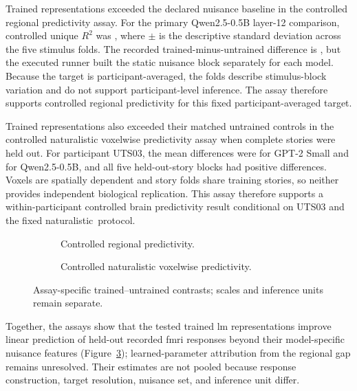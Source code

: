 Trained representations exceeded the declared nuisance baseline in the controlled regional predictivity assay.
For the primary Qwen2.5-0.5B layer-12 comparison, controlled unique \(R^2\) was , where \(\pm\) is the descriptive standard deviation across the five stimulus folds.
The recorded trained-minus-untrained difference is , but the executed runner built the static nuisance block separately for each model.
Because the target is participant-averaged, the folds describe stimulus-block variation and do not support participant-level inference.
The assay therefore supports controlled regional predictivity for this fixed participant-averaged target.

Trained representations also exceeded their matched untrained controls in the controlled naturalistic voxelwise predictivity assay when complete stories were held out.
For participant UTS03, the mean differences were  for GPT-2 Small and  for Qwen2.5-0.5B, and all five held-out-story blocks had positive differences.
Voxels are spatially dependent and story folds share training stories, so neither provides independent biological replication.
This assay therefore supports a within-participant controlled brain predictivity result conditional on UTS03 and the fixed naturalistic~protocol.

\begin{figure}[tbp]
  \centering
  \begin{subfigure}[t]{.495\textwidth}
    \centering
    \resizebox{\linewidth}{!}{}
    \caption{Controlled regional predictivity.}
    \label{fig:controlled-predictivity-regional}
  \end{subfigure}\hfill
  \begin{subfigure}[t]{.495\textwidth}
    \centering
    \resizebox{\linewidth}{!}{}
    \caption{Controlled naturalistic voxelwise predictivity.}
    \label{fig:controlled-predictivity-naturalistic}
  \end{subfigure}
  \caption{Assay-specific trained--untrained contrasts; scales and inference units remain separate.}
  \label{fig:controlled-predictivity-results}
\end{figure}

Together, the assays show that the tested trained \ac{lm} representations improve linear prediction of held-out recorded \ac{fmri} responses beyond their model-specific nuisance features (Figure~\ref{fig:controlled-predictivity-results}); learned-parameter attribution from the regional gap remains unresolved.
Their estimates are not pooled because response construction, target resolution, nuisance set, and inference unit differ.

